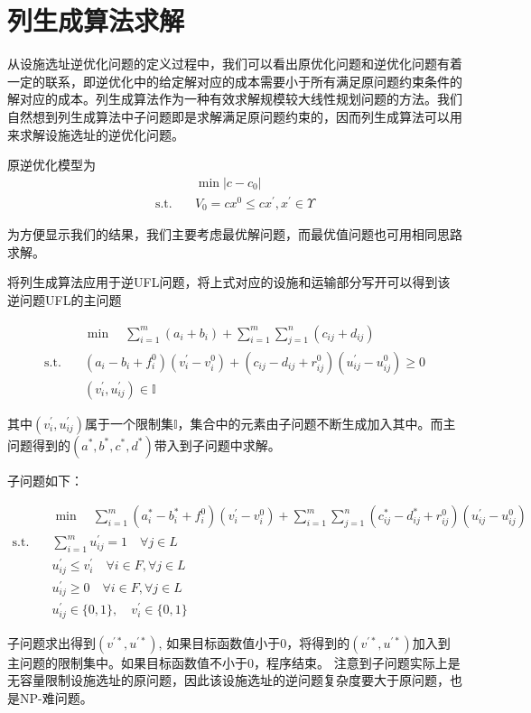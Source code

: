 \documentclass[UTF8]{article}
\begin{document}
\section{列生成算法求解}
从设施选址逆优化问题的定义过程中，我们可以看出原优化问题和逆优化问题有着一定的联系，即逆优化中的给定解对应的成本需要小于所有满足原问题约束条件的解对应的成本。列生成算法作为一种有效求解规模较大线性规划问题的方法。我们自然想到列生成算法中子问题即是求解满足原问题约束的，因而列生成算法可以用来求解设施选址的逆优化问题。

原逆优化模型为
\begin{align*}
&\min |c-c_0|  \\
\text{s.t.}\quad & V_0 = cx^0 \leq cx^{'}, x^{'} \in \Upsilon
\end{align*}

为方便显示我们的结果，我们主要考虑最优解问题，而最优值问题也可用相同思路求解。

将列生成算法应用于逆UFL问题，将上式对应的设施和运输部分写开可以得到该逆问题UFL的主问题

\begin{align*}
&\min \quad \sum_{i=1}^m(a_i+b_i)+\sum_{i=1}^m\sum_{j=1}^n(c_{ij}+d_{ij})\\
\text{s.t.}\quad & (a_i-b_i+f_i^0)(v_i^{'}-v_i^{0}) + (c_{ij}-d_{ij}+r_{ij}^0)(u_{ij}^{'}-u_{ij}^{0})  \geq 0 \\
& (v_i^{'},u_{ij}^{'}) \in \mathbb{I}
\end{align*}

其中$(v_i^{'},u_{ij}^{'})$属于一个限制集$\mathbb{I}$，集合中的元素由子问题不断生成加入其中。而主问题得到的$(a^*,b^*,c^*,d^*)$带入到子问题中求解。

子问题如下：

\begin{align}
&\min \quad \sum_{i=1}^m(a_i^*-b_i^*+f_i^0)(v_i^{'}-v_i^{0})+\sum_{i=1}^m\sum_{j=1}^n(c_{ij}^*-d_{ij}^*+r_{ij}^0)(u_{ij}^{'}-u_{ij}^{0}) \\
\text{s.t.}\quad & \sum_{i=1}^m u_{ij}^{'} =1 \quad \forall j\in L \\
& u_{ij}^{'} \leq v_{i}^{'} \quad \forall i \in F, \forall j \in L \\
& u_{ij}^{'} \geq 0 \quad \forall i \in F, \forall j \in L \\
&u_{ij}^{'} \in \{0,1\} ,\quad v_{i}^{'} \in \{0,1\}
\end{align}

子问题求出得到$(v^{'*},u^{'*})$, 如果目标函数值小于0，将得到的$(v^{'*},u^{'*})$加入到主问题的限制集中。如果目标函数值不小于0，程序结束。
注意到子问题实际上是无容量限制设施选址的原问题，因此该设施选址的逆问题复杂度要大于原问题，也是NP-难问题。
\end{document}
